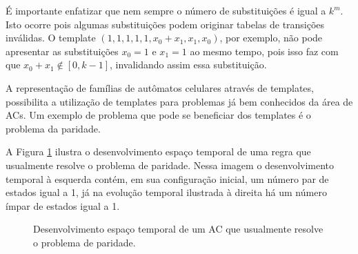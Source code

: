 \documentclass[12pt,a4paper]{article}
\begin{document}
É importante enfatizar que nem sempre o número de substituições é igual a $k^m$. Isto ocorre pois algumas substituições podem originar tabelas de transições inválidas. O template $(1,1,1,1,1,x_0+x_1,x_1,x_0)$, por exemplo, não pode apresentar as substituições $x_0=1$ e $x_1=1$ ao mesmo tempo, pois isso faz com que $x_0 + x_1 \notin [0, k-1]$, invalidando assim essa substituição.

A representação de famílias de autômatos celulares através de templates, possibilita a utilização de templates para problemas já bem conhecidos da área de ACs. Um exemplo de problema que pode se beneficiar dos templates é o problema da paridade.

A Figura \ref{fig:parity-rule} ilustra o desenvolvimento espaço temporal de uma regra que usualmente resolve o problema de paridade. Nessa imagem o desenvolvimento temporal à esquerda contém, em sua configuração inicial, um número par de estados igual a 1, já na evolução temporal ilustrada à direita há um número ímpar de estados igual a 1.

\begin{figure}[h!]
	\center
	\qquad
	\caption{Desenvolvimento espaço temporal de um AC que usualmente resolve o problema de paridade.}
	\label{fig:parity-rule}
\end{figure}
\end{document}

